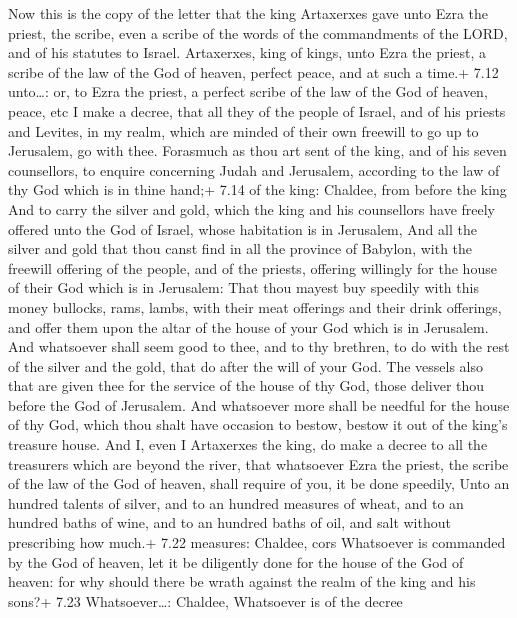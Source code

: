  Now this is the copy of the letter that the king
Artaxerxes gave unto Ezra the priest, the scribe, even a scribe of the
words of the commandments of the LORD, and of his statutes to Israel.
 Artaxerxes, king of kings, unto Ezra the priest, a scribe
of the law of the God of heaven, perfect peace, and at such a time.+
7.12 unto\ldots: or, to Ezra the priest, a perfect scribe of the law of
the God of heaven, peace, etc  I make a decree, that all
they of the people of Israel, and of his priests and Levites, in my
realm, which are minded of their own freewill to go up to Jerusalem, go
with thee.  Forasmuch as thou art sent of the king, and of
his seven counsellors, to enquire concerning Judah and Jerusalem,
according to the law of thy God which is in thine hand;+ 7.14 of the
king: Chaldee, from before the king  And to carry the
silver and gold, which the king and his counsellors have freely offered
unto the God of Israel, whose habitation is in Jerusalem, 
And all the silver and gold that thou canst find in all the province of
Babylon, with the freewill offering of the people, and of the priests,
offering willingly for the house of their God which is in Jerusalem:
 That thou mayest buy speedily with this money bullocks,
rams, lambs, with their meat offerings and their drink offerings, and
offer them upon the altar of the house of your God which is in
Jerusalem.  And whatsoever shall seem good to thee, and to
thy brethren, to do with the rest of the silver and the gold, that do
after the will of your God.  The vessels also that are
given thee for the service of the house of thy God, those deliver thou
before the God of Jerusalem.  And whatsoever more shall be
needful for the house of thy God, which thou shalt have occasion to
bestow, bestow it out of the king's treasure house.  And I,
even I Artaxerxes the king, do make a decree to all the treasurers which
are beyond the river, that whatsoever Ezra the priest, the scribe of the
law of the God of heaven, shall require of you, it be done speedily,
 Unto an hundred talents of silver, and to an hundred
measures of wheat, and to an hundred baths of wine, and to an hundred
baths of oil, and salt without prescribing how much.+ 7.22 measures:
Chaldee, cors  Whatsoever is commanded by the God of
heaven, let it be diligently done for the house of the God of heaven:
for why should there be wrath against the realm of the king and his
sons?+ 7.23 Whatsoever\ldots: Chaldee, Whatsoever is of the decree
